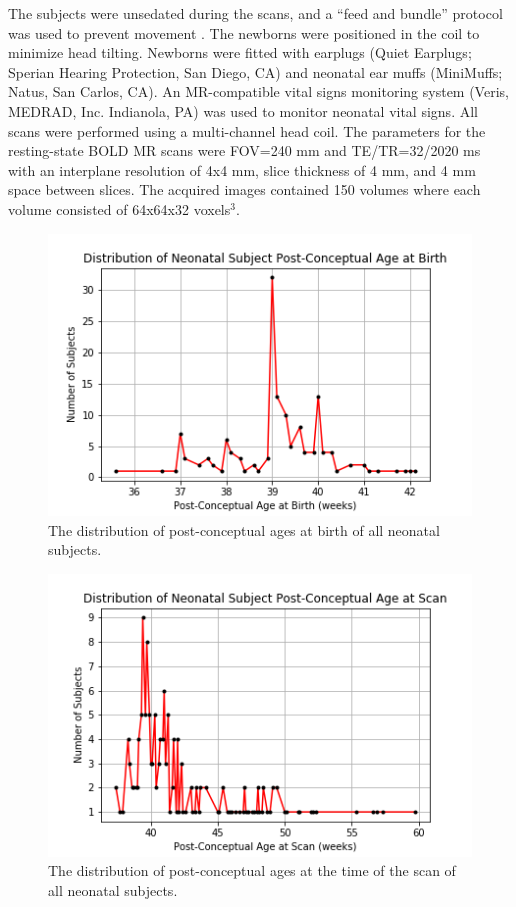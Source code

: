 The subjects were unsedated during the scans, and a ``feed and bundle'' protocol was used to prevent movement \cite{Windram2011}. The newborns were positioned in the coil to minimize head tilting. Newborns were fitted with earplugs (Quiet Earplugs; Sperian Hearing Protection, San Diego, CA) and neonatal ear muffs (MiniMuffs; Natus, San Carlos, CA). An MR-compatible vital signs monitoring system (Veris, MEDRAD, Inc. Indianola, PA) was used to monitor neonatal vital signs. All scans were performed using a multi-channel head coil. The parameters for the resting-state BOLD MR scans were FOV=240 mm and TE/TR=32/2020 ms with an interplane resolution of 4x4 mm, slice thickness of 4 mm, and 4 mm space between slices. The acquired images contained 150 volumes where each volume consisted of 64x64x32 voxels$^3$.

\begin{figure}
\centering
\includegraphics[width=.75\textwidth]{5/demo_neonate_subj_pca.png}
\caption{The distribution of post-conceptual ages at birth of all neonatal subjects.}
\label{ch5:neonates:birthpca}
\end{figure}

\begin{figure}
\centering
\includegraphics[width=.75\textwidth]{5/demo_neonate_scan_pca.png}
\caption{The distribution of post-conceptual ages at the time of the scan of all neonatal subjects.}
\label{ch5:neonates:scanpca}
\end{figure}

